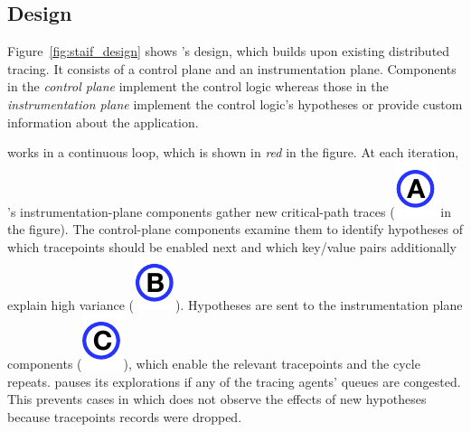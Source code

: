 \subsection{Design}
Figure~\ref{fig:staif_design} shows \STAIF{}'s design, which builds
upon existing distributed tracing.  It consists of a
control plane and an instrumentation plane.  Components in the
\textit{control plane} implement the control logic whereas
those in the \textit{instrumentation plane} implement the control
logic's hypotheses or provide custom information about the
application.

\STAIF{} works in a continuous loop, which is shown in \textit{red}
in the figure.  At each iteration, \STAIF{}'s instrumentation-plane
components gather new critical-path traces (\includegraphics[scale=0.5, trim=-0 0.3cm 0 0]{figures/marked_A.pdf} in the figure).
The control-plane components examine them to identify hypotheses of
which tracepoints should be enabled next and which key/value pairs
additionally explain high variance (\includegraphics[scale=0.5, trim=-0 0.3cm 0 0]{figures/marked_B.pdf}).  Hypotheses are sent to
the instrumentation plane components (\includegraphics[scale=0.5, trim=-0 0.3cm 0 0]{figures/marked_C.pdf}), which enable the
relevant tracepoints and the cycle repeats. \STAIF{}
pauses its explorations if any of the tracing agents' queues are
congested.  This prevents cases in which \STAIF{} does not observe the
effects of new hypotheses because tracepoints records were dropped.

